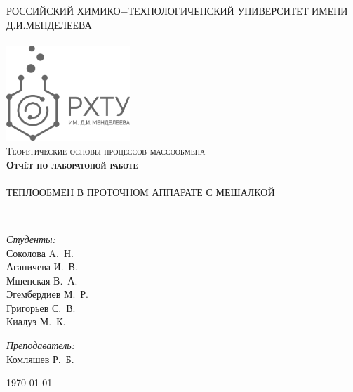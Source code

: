 \begin{titlepage}
\begin{center}

\textsc{\large РОССИЙСКИЙ ХИМИКО$-$ТЕХНОЛОГИЧЕНСКИЙ УНИВЕРСИТЕТ ИМЕНИ Д.И.МЕНДЕЛЕЕВА}\\
\textsc{\large }\\[2cm]

\includegraphics[width=0.35\textwidth]{img/logo.png}~\\[2cm]

\textsc{\Large Теоретические основы процессов массообмена}\\[0.3cm]

\textsc{ \textbf{Отчёт по лаборатоной работе }}\\[0.3cm]

\HRule \\[0.4cm]
{ \large ТЕПЛООБМЕН В ПРОТОЧНОМ АППАРАТЕ С МЕШАЛКОЙ \\[0.4cm] }

\HRule \\[1.5cm]

\noindent
\begin{minipage}[t]{0.6\textwidth}
\begin{flushleft} \large
\emph{Студенты:}\\
Соколова \textsc{A.~Н.} \\
Аганичева \textsc{И.~В.} \\
Мшенская \textsc{В.~А.} \\
Эгембердиев \textsc{М.~Р.} \\
Григорьев \textsc{С.~В.} \\
Киалуэ \textsc{М.~К.} \\
\end{flushleft}
\end{minipage}%
\noindent
\begin{minipage}[t]{0.2\textwidth}
\begin{flushleft} \large
\emph{Преподаватель:}\\
Комляшев \textsc{Р.~Б.}
\end{flushleft}
\end{minipage}

\vfill

{\large \today}

\end{center}
\end{titlepage}